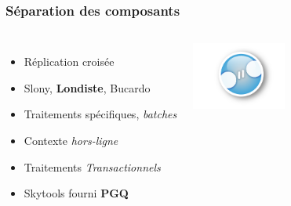 \documentclass[english]{beamer}
\begin{document}
\begin{frame}[fragile]
  \frametitle{Séparation des composants}

  \linebreak

\begin{columns}[c]

  \begin{itemize}
   \item<1-> Réplication croisée
   \item<2-> Slony, \textbf{Londiste}, Bucardo
   \item<3-> Traitements spécifiques, \textit{batches}
   \item<3-> Contexte \textit{hors-ligne}
   \item<3-> Traitements \textit{Transactionnels}
   \item<4-> Skytools fourni \alert{\textbf{PGQ}}
  \end{itemize}  

\includegraphics[height=6em]{cross-replication.jpg}
\end{columns}
\end{frame}

\end{document}
